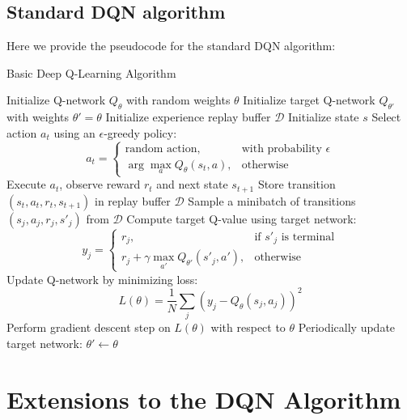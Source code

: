 \documentclass[a4paper,12pt]{article}
\begin{document}
\subsection{Standard DQN algorithm}
Here we provide the pseudocode for the standard DQN algorithm:
\begin{algorithm}
    \caption{Basic Deep Q-Learning Algorithm}
    \begin{algorithmic}[1]
    \State Initialize Q-network \( Q_\theta \) with random weights \( \theta \)
    \State Initialize target Q-network \( Q_{\theta'} \) with weights \( \theta' = \theta \)
    \State Initialize experience replay buffer \( \mathcal{D} \)
        \State Initialize state \( s \)
            \State Select action \( a_t \) using an \(\epsilon\)-greedy policy: 
            \[
            a_t = 
            \begin{cases}
            \text{random action}, & \text{with probability } \epsilon \\
            \arg\max_a Q_\theta(s_t, a), & \text{otherwise}
            \end{cases}
            \]
            \State Execute \( a_t \), observe reward \( r_t \) and next state \( s_{t+1} \)
            \State Store transition \( (s_t, a_t, r_t, s_{t+1}) \) in replay buffer \( \mathcal{D} \)
            \State Sample a minibatch of transitions \( (s_j, a_j, r_j, s'_j) \) from \( \mathcal{D} \)
            \State Compute target Q-value using target network:
            \[
            y_j =
            \begin{cases}
            r_j, & \text{if } s'_j \text{ is terminal} \\
            r_j + \gamma \max_{a'} Q_{\theta'}(s'_j, a'), & \text{otherwise}
            \end{cases}
            \]
            \State Update Q-network by minimizing loss:
            \[
            L(\theta) = \frac{1}{N} \sum_j \left( y_j - Q_\theta(s_j, a_j) \right)^2
            \]
            \State Perform gradient descent step on \( L(\theta) \) with respect to \( \theta \)
            \State Periodically update target network: \( \theta' \leftarrow \theta \)
        \EndFor
    \EndFor
    \end{algorithmic}
\end{algorithm}

\newpage
\section{Extensions to the DQN Algorithm}
\end{document}

